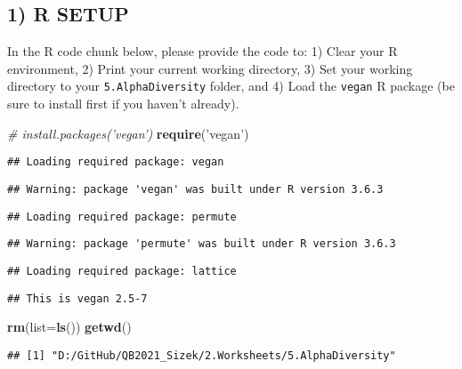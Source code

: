 \documentclass[
]{article}
\newenvironment{Shaded}{\begin{snugshade}}{\end{snugshade}}
\newcommand{\CommentTok}[1]{\textcolor[rgb]{0.56,0.35,0.01}{\textit{#1}}}
\newcommand{\DataTypeTok}[1]{\textcolor[rgb]{0.13,0.29,0.53}{#1}}
\newcommand{\KeywordTok}[1]{\textcolor[rgb]{0.13,0.29,0.53}{\textbf{#1}}}
\newcommand{\NormalTok}[1]{#1}
\newcommand{\StringTok}[1]{\textcolor[rgb]{0.31,0.60,0.02}{#1}}
\begin{document}
\hypertarget{r-setup}{%
\subsection{1) R SETUP}\label{r-setup}}

In the R code chunk below, please provide the code to: 1) Clear your R
environment, 2) Print your current working directory, 3) Set your
working directory to your \texttt{5.AlphaDiversity} folder, and 4) Load
the \texttt{vegan} R package (be sure to install first if you haven't
already).

\begin{Shaded}
\begin{Highlighting}[]
\CommentTok{# install.packages('vegan')}
\KeywordTok{require}\NormalTok{(}\StringTok{'vegan'}\NormalTok{)}
\end{Highlighting}
\end{Shaded}

\begin{verbatim}
## Loading required package: vegan
\end{verbatim}

\begin{verbatim}
## Warning: package 'vegan' was built under R version 3.6.3
\end{verbatim}

\begin{verbatim}
## Loading required package: permute
\end{verbatim}

\begin{verbatim}
## Warning: package 'permute' was built under R version 3.6.3
\end{verbatim}

\begin{verbatim}
## Loading required package: lattice
\end{verbatim}

\begin{verbatim}
## This is vegan 2.5-7
\end{verbatim}

\begin{Shaded}
\begin{Highlighting}[]
\KeywordTok{rm}\NormalTok{(}\DataTypeTok{list=}\KeywordTok{ls}\NormalTok{())}
\KeywordTok{getwd}\NormalTok{()}
\end{Highlighting}
\end{Shaded}

\begin{verbatim}
## [1] "D:/GitHub/QB2021_Sizek/2.Worksheets/5.AlphaDiversity"
\end{verbatim}
\end{document}
